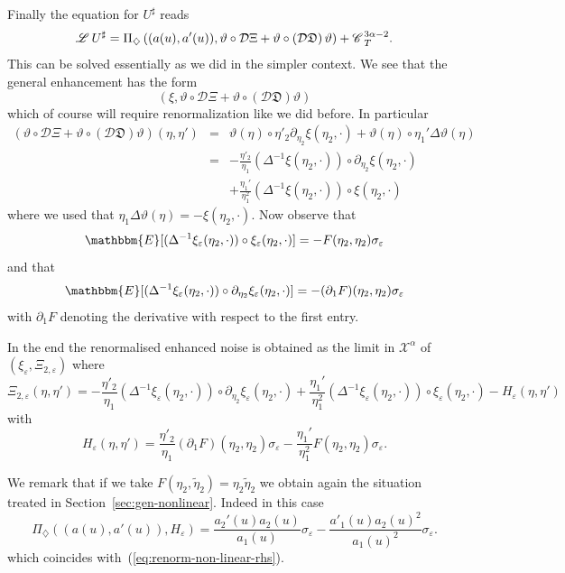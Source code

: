 \documentclass{amsart}
\theoremstyle{remark}
\theoremstyle{definition}
\newcommand{\CC}{\mathscr{C} \hspace{.1em}}
\newcommand{\LL}{\mathscr{L} \hspace{.2em}}
\newcommand{\DF}{\mathfrak{D}}
\begin{document}
Finally the equation for $U^{\sharp}$ reads
\[ \LL U^{\sharp} = \Pi_{\diamondsuit} \left( (a (u), a' (u)), \vartheta \circ
   \mathcal{D} \Xi + \vartheta \circ \left( \mathcal{D} \DF \right) \vartheta
   \right) + \CC_T^{3 \alpha - 2} . \]
This can be solved essentially as we did in the simpler context. We see that
the general enhancement has the form
\[ \left( \xi, \vartheta \circ \mathcal{D} \Xi + \vartheta \circ \left(
   \mathcal{D} \DF \right) \vartheta \right) \]
which of course will require renormalization like we did before. In particular
\begin{eqnarray*}
  \left( \vartheta \circ \mathcal{D} \Xi + \vartheta \circ \left( \mathcal{D}
  \DF \right) \vartheta \right) (\eta, \eta') & = & \vartheta (\eta) \circ
  \eta'_2 \partial_{\eta_2} \xi (\eta_2, \cdot) + \vartheta (\eta) \circ
  \eta_1' \Delta \vartheta (\eta)\\
  & = & - \frac{\eta'_2}{\eta_1} (\Delta^{- 1} \xi (\eta_2, \cdot)) \circ
  \partial_{\eta_2} \xi (\eta_2, \cdot)\\
  &  & + \frac{\eta_1'}{\eta_1^2} (\Delta^{- 1} \xi (\eta_2, \cdot)) \circ
  \xi (\eta_2, \cdot)
\end{eqnarray*}
where we used that $\eta_1 \Delta \vartheta (\eta) = - \xi (\eta_2, \cdot)$.
Now observe that
\[ \mathbbm{E} [(\Delta^{- 1} \xi_{\varepsilon} (\eta_2, \cdot)) \circ
   \xi_{\varepsilon} (\eta_2, \cdot)] = - F (\eta_2, \eta_2)
   \sigma_{\varepsilon} \]
and that
\[ \mathbbm{E} [(\Delta^{- 1} \xi_{\varepsilon} (\eta_2, \cdot)) \circ
   \partial_{\eta_2} \xi_{\varepsilon} (\eta_2, \cdot)] = - (\partial_1 F)
   (\eta_2, \eta_2) \sigma_{\varepsilon} \]
with $\partial_1 F$ denoting the derivative with respect to the first entry.

In the end the renormalised enhanced noise is obtained as the limit in
$\mathcal{X}^{\alpha}$ of $(\xi_{\varepsilon}, \Xi_{2, \varepsilon})$ where
\[ \Xi_{2, \varepsilon} (\eta, \eta') = - \frac{\eta'_2}{\eta_1} (\Delta^{-
   1} \xi_{\varepsilon} (\eta_2, \cdot)) \circ \partial_{\eta_2}
   \xi_{\varepsilon} (\eta_2, \cdot) + \frac{\eta_1'}{\eta_1^2} (\Delta^{- 1}
   \xi_{\varepsilon} (\eta_2, \cdot)) \circ \xi_{\varepsilon} (\eta_2, \cdot)
   - H_{\varepsilon} (\eta, \eta') \]
with
\[ H_{\varepsilon} (\eta, \eta') = \frac{\eta'_2}{\eta_1} (\partial_1 F)
   (\eta_2, \eta_2) \sigma_{\varepsilon} - \frac{\eta_1'}{\eta_1^2} F (\eta_2,
   \eta_2) \sigma_{\varepsilon} . \]


We remark that if we take $F (\eta_2, \tilde{\eta}_2) = \eta_2 \tilde{\eta}_2$
we obtain again the situation treated in Section~\ref{sec:gen-nonlinear}.
Indeed in this case
\[ \Pi_{\diamondsuit} ((a (u), a' (u)), H_{\varepsilon}) = \frac{a_2' (u) a_2
   (u)}{a_1 (u)} \sigma_{\varepsilon} - \frac{a'_1 (u) a_2 (u)^2}{a_1 (u)^2}
   \sigma_{\varepsilon} . \]
which coincides with~(\ref{eq:renorm-non-linear-rhs}).
\end{document}
